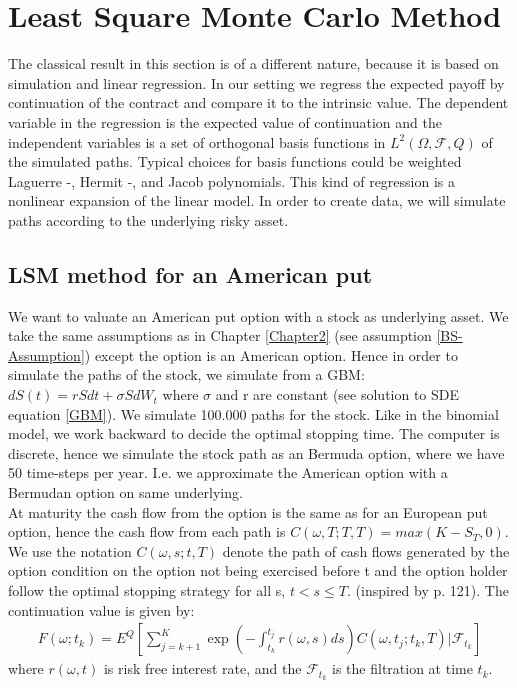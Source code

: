 
\section{Least Square Monte Carlo Method}\label{LSM}
The classical result in this section is of a different nature, because it is based on simulation and linear regression. In our setting we regress the expected payoff by continuation of the contract and compare it to the intrinsic value. The dependent variable in the regression is the expected value of continuation and the independent variables is a set of orthogonal basis functions in $L^2(\Omega, \mathcal{F}, Q)$ of the simulated paths. Typical choices for basis functions could be weighted Laguerre -, Hermit -, and Jacob polynomials. This kind of regression is a nonlinear expansion of the linear model. In order to create data, we will simulate paths according to the underlying risky asset. 

\subsection{LSM method for an American put}           
We want to valuate an American put option with a stock as underlying asset. We take the same assumptions as in Chapter \ref{Chapter2} (see assumption \ref{BS-Assumption}) except the option is an American option. Hence in order to simulate the paths of the stock, we simulate from a GBM: $dS(t)=rSdt + \sigma S dW_t$ where $\sigma$ and r are constant (see solution to SDE equation \ref{GBM}). We simulate 100.000 paths for the stock. Like in the binomial model, we work backward to decide the optimal stopping time. The computer is discrete, hence we simulate the stock path as an Bermuda option, where we have 50 time-steps per year. I.e. we approximate the American option with a Bermudan option on same underlying. \\

At maturity the cash flow from the option is the same as for an European put option, hence the cash flow from each path is $C(\omega,T;T, T)=max(K-S_T,0)$. We use the notation $C(\omega, s; t, T)$ denote the path of cash flows generated by the option condition on the option not being exercised before t and the option holder follow the optimal stopping strategy for all s, $t<s\leq T$.
(inspired by \parencite{lsm} p. 121). The continuation value is given by:
\begin{equation}\label{continuation-value}
\begin{split}
F(\omega; t_k)=E^Q[\sum_{j=k+1}^K \exp(-\int_{t_k}^{t_j} r(\omega,s) ds)C(\omega,t_j; t_k, T)|\mathcal{F}_{t_k}]
\end{split}
\end{equation}
where $r(\omega,t)$ is risk free interest rate, and the $\mathcal{F}_{t_k}$ is the filtration at time $t_k$.\\

